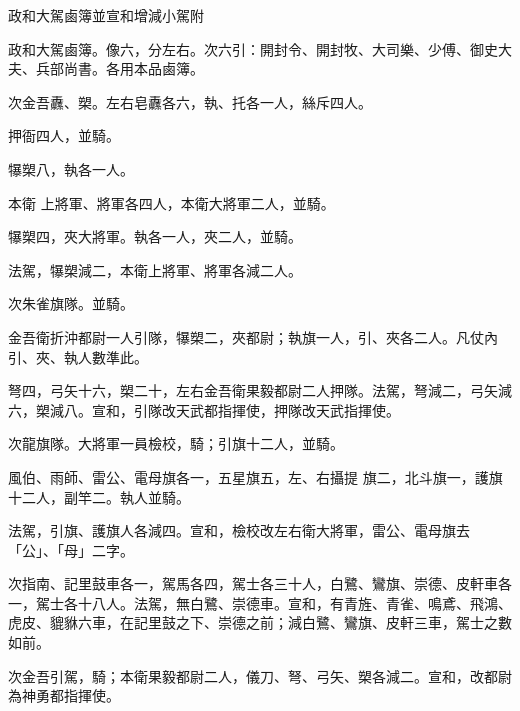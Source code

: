 
\begin{pinyinscope}

 政和大駕鹵簿並宣和增減小駕附



 政和大駕鹵簿。像六，分左右。次六引：開封令、開封牧、大司樂、少傅、御史大夫、兵部尚書。各用本品鹵簿。



 次金吾纛、槊。左右皂纛各六，執、托各一人，絲斥四人。



 押衙四人，並騎。



 犦槊八，執各一人。



 本衛
 上將軍、將軍各四人，本衛大將軍二人，並騎。



 犦槊四，夾大將軍。執各一人，夾二人，並騎。



 法駕，犦槊減二，本衛上將軍、將軍各減二人。



 次朱雀旗隊。並騎。



 金吾衛折沖都尉一人引隊，犦槊二，夾都尉；執旗一人，引、夾各二人。凡仗內引、夾、執人數準此。



 弩四，弓矢十六，槊二十，左右金吾衛果毅都尉二人押隊。法駕，弩減二，弓矢減六，槊減八。宣和，引隊改天武都指揮使，押隊改天武指揮使。



 次龍旗隊。大將軍一員檢校，騎；引旗十二人，並騎。



 風伯、雨師、雷公、電母旗各一，五星旗五，左、右攝提
 旗二，北斗旗一，護旗十二人，副竿二。執人並騎。



 法駕，引旗、護旗人各減四。宣和，檢校改左右衛大將軍，雷公、電母旗去「公」、「母」二字。



 次指南、記里鼓車各一，駕馬各四，駕士各三十人，白鷺、鸞旗、崇德、皮軒車各一，駕士各十八人。法駕，無白鷺、崇德車。宣和，有青旌、青雀、鳴鳶、飛鴻、虎皮、貔貅六車，在記里鼓之下、崇德之前；減白鷺、鸞旗、皮軒三車，駕士之數如前。



 次金吾引駕，騎；本衛果毅都尉二人，儀刀、弩、弓矢、槊各減二。宣和，改都尉為神勇都指揮使。




\end{pinyinscope}
